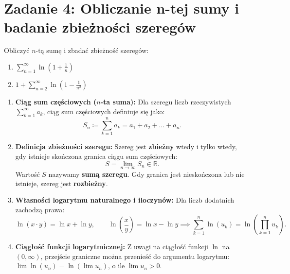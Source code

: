 \section{Zadanie 4: Obliczanie n-tej sumy i badanie zbieżności szeregów}
\label{sec:zadanie4}

\begin{tresczadania}
Obliczyć $n$-tą sumę i zbadać zbieżność szeregów:
\begin{enumerate}[label=(\alph*),leftmargin=2em]
    \item $\displaystyle \sum_{n=1}^{\infty} \ln\left(1 + \frac{1}{n}\right)$
    \item $\displaystyle 1 + \sum_{n=2}^{\infty} \ln\left(1 - \frac{1}{n^2}\right)$
\end{enumerate}
\end{tresczadania}

\vspace{0.2cm}

\begin{teoriabox}
\begin{enumerate}
    \item \textbf{Ciąg sum częściowych ($n$-ta suma):}
    Dla szeregu liczb rzeczywistych $\sum_{k=1}^{\infty} a_k$, ciąg sum częściowych definiuje się jako:
    \begin{equation}
        S_n \coloneqq \sum_{k=1}^{n} a_k = a_1 + a_2 + \dots + a_n.
        \label{eq:partial_sum_def}
    \end{equation}

    \item \textbf{Definicja zbieżności szeregu:}
    Szereg jest \textbf{zbieżny} wtedy i tylko wtedy, gdy istnieje skończona granica ciągu sum częściowych:
    \begin{equation*}
        S = \lim_{n \to \infty} S_n \in \mathbb{R}.
    \end{equation*}
    Wartość $S$ nazywamy \textbf{sumą szeregu}. Gdy granica jest nieskończona lub nie istnieje, szereg jest \textbf{rozbieżny}.

    \item \textbf{Własności logarytmu naturalnego i iloczynów:}
    Dla liczb dodatnich zachodzą prawa:
    \begin{equation*}
        \ln(x \cdot y) = \ln x + \ln y, \qquad \ln\left(\frac{x}{y}\right) = \ln x - \ln y \implies \sum_{k=1}^{n} \ln(u_k) = \ln\left( \prod_{k=1}^{n} u_k \right).
    \end{equation*}

    \item \textbf{Ciągłość funkcji logarytmicznej:}
    Z uwagi na ciągłość funkcji $\ln$ na $(0, \infty)$, przejście graniczne można przenieść do argumentu logarytmu: $\lim \ln(u_n) = \ln(\lim u_n)$, o ile $\lim u_n > 0$.
\end{enumerate}
\end{teoriabox}

